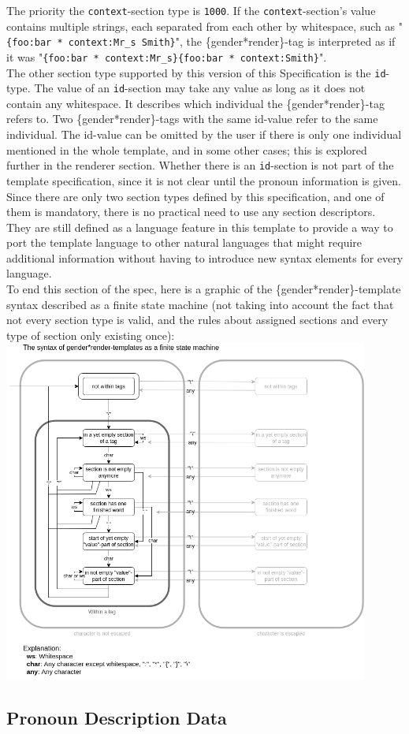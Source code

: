 \documentclass{article}
\begin{document}
    The priority the \texttt{context}-section type is \texttt{1000}.
    If the \texttt{context}-section's value contains multiple strings, each separated from each other by whitespace, such as "\texttt{\{foo:bar * context:Mr\_s Smith\}}", the \{gender*render\}-tag is interpreted as if it was "\texttt{\{foo:bar * context:Mr\_s\}\{foo:bar * context:Smith\}}". \\

    The other section type supported by this version of this Specification is the \texttt{id}-type.
    The value of an \texttt{id}-section may take any value as long as it does not contain any whitespace.
    It describes which individual the \{gender*render\}-tag refers to.
    Two \{gender*render\}-tags with the same id-value refer to the same individual.
    The id-value can be omitted by the user if there is only one individual mentioned in the whole template, and in some other cases;
    this is explored further in the renderer section.
    Whether there is an \texttt{id}-section is not part of the template specification, since it is not clear until the pronoun information is given.\\

    Since there are only two section types defined by this specification, and one of them is mandatory, there is no practical need to use any section descriptors.
    They are still defined as a language feature in this template to provide a way to port the template language to other natural languages that might require additional information without having to introduce new syntax elements for every language.\\

    To end this section of the spec, here is a graphic of the \{gender*render\}-template syntax described as a finite state machine (not taking into account the fact that not every section type is valid, and the rules about assigned sections and every type of section only existing once):\\

    \includegraphics[width=12cm]{images/template-as-finite-state-machine.png}

    \subsection{Pronoun Description Data}
\end{document}
